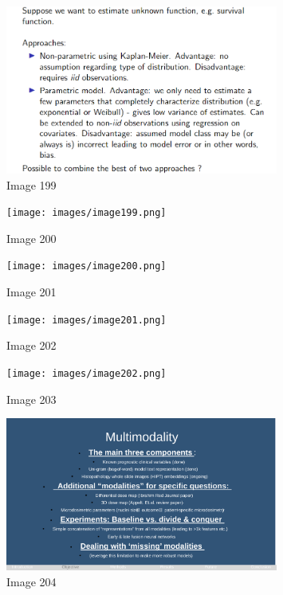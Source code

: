 \documentclass{article}%
\begin{document}
\begin{figure}[h!]%
\centering%
\includegraphics[width=0.8\textwidth]{images/image198.png}%
\caption{Image 199}%
\end{figure}

%


\begin{figure}[h!]%
\centering%
\texttt{[image: images/image199.png]}%
\caption{Image 200}%
\end{figure}

%


\begin{figure}[h!]%
\centering%
\texttt{[image: images/image200.png]}%
\caption{Image 201}%
\end{figure}

%


\begin{figure}[h!]%
\centering%
\texttt{[image: images/image201.png]}%
\caption{Image 202}%
\end{figure}

%


\begin{figure}[h!]%
\centering%
\texttt{[image: images/image202.png]}%
\caption{Image 203}%
\end{figure}

%


\begin{figure}[h!]%
\centering%
\includegraphics[width=0.8\textwidth]{images/image203.png}%
\caption{Image 204}%
\end{figure}
\end{document}
